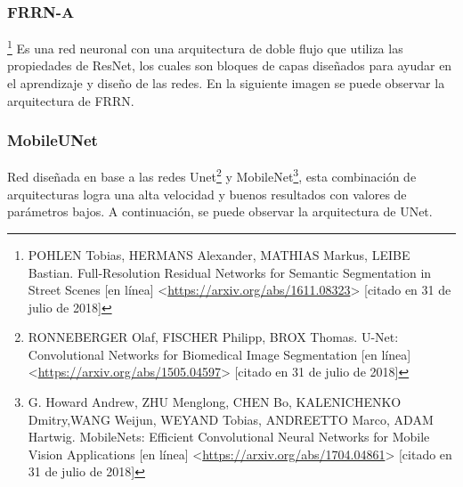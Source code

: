 

\subsubsection{FRRN-A}\footnote[19]{POHLEN Tobias, HERMANS Alexander, MATHIAS Markus, LEIBE Bastian. Full-Resolution Residual Networks for Semantic Segmentation in Street Scenes [en línea] <\url{https://arxiv.org/abs/1611.08323}> [citado en 31 de julio de 2018]} Es una red neuronal con una arquitectura de doble flujo que utiliza las propiedades de ResNet, los cuales son bloques de capas diseñados para ayudar en el aprendizaje y diseño de las redes. En la siguiente imagen se puede observar la arquitectura de FRRN. 


\subsubsection{MobileUNet} Red diseñada en base a las redes Unet\footnote[20]{RONNEBERGER Olaf, FISCHER Philipp, BROX Thomas. U-Net: Convolutional Networks for Biomedical Image Segmentation [en línea] <\url{https://arxiv.org/abs/1505.04597}> [citado en 31 de julio de 2018]} y MobileNet\footnote[21]{G. Howard Andrew, ZHU Menglong, CHEN Bo, KALENICHENKO Dmitry,WANG Weijun, WEYAND Tobias, ANDREETTO Marco, ADAM Hartwig. MobileNets: Efficient Convolutional Neural Networks for Mobile Vision Applications [en línea] <\url{https://arxiv.org/abs/1704.04861}> [citado en 31 de julio de 2018]}, esta combinación de arquitecturas logra una alta velocidad y buenos resultados con valores de parámetros bajos. A continuación, se puede observar la arquitectura de UNet. 


